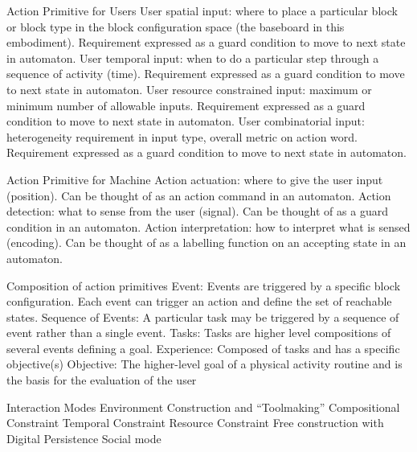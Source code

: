 \documentclass[]{article}
\begin{document}
Action Primitive for Users
User spatial input: where to place a particular block or block type in the block configuration space (the baseboard in this embodiment). Requirement expressed as a guard condition to move to next state in automaton.
User temporal input: when to do a particular step through a sequence of activity (time). Requirement expressed as a guard condition to move to next state in automaton.
User resource constrained input: maximum or minimum  number of allowable inputs. Requirement expressed as a guard condition to move to next state in automaton.
User combinatorial input: heterogeneity requirement in input type, overall metric on action word. Requirement expressed as a guard condition to move to next state in automaton.

Action Primitive for Machine
Action actuation: where to give the user input (position). Can be thought of as an action command in an automaton.
Action detection: what to sense from the user (signal). Can be thought of as a guard condition in an automaton.
Action interpretation: how to interpret what is sensed (encoding). Can be thought of as a labelling function on an accepting state in an automaton.

Composition of action primitives
Event:  Events are triggered by a specific block configuration. Each event can trigger an action and define the set of reachable states. 
Sequence of Events: A particular task may be triggered by a sequence of event rather than a single event. 
Tasks: Tasks are higher level compositions of several events defining a goal.
Experience: Composed of tasks and has a specific objective(s)
Objective: The higher-level goal of a physical activity routine and is the basis for the evaluation of the user






Interaction Modes
Environment Construction and “Toolmaking”
Compositional Constraint
Temporal Constraint
Resource Constraint
Free construction with Digital Persistence
Social mode
\end{document}
